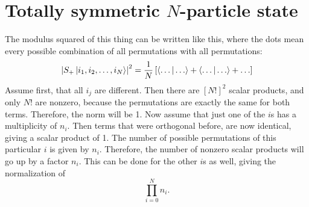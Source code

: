 \documentclass[11pt, english, fleqn, DIV=15, headinclude, BCOR=1.5cm]{scrartcl}
\begin{document}
\section{Totally symmetric $N$-particle state}

The modulus squared of this thing can be written like this, where the dots mean
every possible combination of all permutations with all permutations:
\[
    \left| S_+ \ket{i_1, i_2, \ldots, i_N} \right|^2
    = \frac{1}{N} \left[ 
        \braket{\ldots | \ldots}
        +
        \braket{\ldots | \ldots}
        +
        \ldots
     \right]
\]
Assume first, that all $i_j$ are different. Then there are $[N!]^2$ scalar
products, and only $N!$ are nonzero, because the permutations are exactly the
same for both terms. Therefore, the norm will be 1. Now assume that just one of
the $i$s has a multiplicity of $n_i$. Then terms that were orthogonal before,
are now identical, giving a scalar product of 1. The number of possible
permutations of this particular $i$ is given by $n_i$. Therefore, the number of
nonzero scalar products will go up by a factor $n_i$. This can be done for the
other $i$s as well, giving the normalization of
\[
    \prod_{i = 0}^N n_i.
\]
\end{document}
